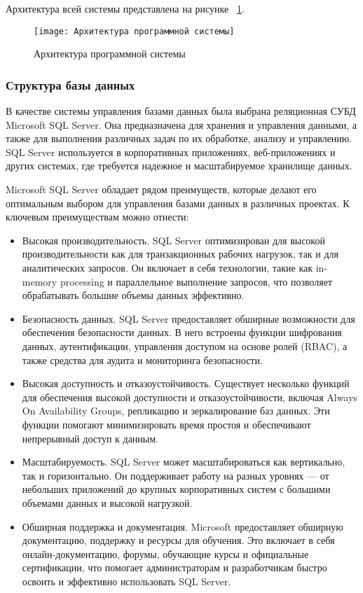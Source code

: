 Архитектура всей системы представлена на рисунке ~\ref{templ:image2}.
\begin{figure}[H]
	\texttt{[image: Архитектура программной системы]}
	\caption{Архитектура программной системы}
	\label{templ:image2}
\end{figure}

\subsubsection{Структура базы данных}

В качестве системы управления базами данных была выбрана реляционная СУБД Microsoft SQL Server. Она предназначена для хранения и управления данными, а также для выполнения различных задач по их обработке, анализу и управлению. SQL Server используется в корпоративных приложениях, веб-приложениях и других системах, где требуется надежное и масштабируемое хранилище данных.

Microsoft SQL Server обладает рядом преимуществ, которые делают его оптимальным выбором для управления базами данных в различных проектах. К ключевым преимуществам можно отнести:
\begin{itemize}
	\item Высокая производительность. SQL Server оптимизирован для высокой производительности как для транзакционных рабочих нагрузок, так и для аналитических запросов. Он включает в себя технологии, такие как in-memory processing и параллельное выполнение запросов, что позволяет обрабатывать большие объемы данных эффективно.
	\item Безопасность данных. SQL Server предоставляет обширные возможности для обеспечения безопасности данных. В него встроены функции шифрования данных, аутентификации, управления доступом на основе ролей (RBAC), а также средства для аудита и мониторинга безопасности.
	\item Высокая доступность и отказоустойчивость. Существует несколько функций для обеспечения высокой доступности и отказоустойчивости, включая Always On Availability Groups, репликацию и зеркалирование баз данных. Эти функции помогают минимизировать время простоя и обеспечивают непрерывный доступ к данным.
	\item Масштабируемость. SQL Server может масштабироваться как вертикально, так и горизонтально. Он поддерживает работу на разных уровнях — от небольших приложений до крупных корпоративных систем с большими объемами данных и высокой нагрузкой.
	\item Обширная поддержка и документация. Microsoft предоставляет обширную документацию, поддержку и ресурсы для обучения. Это включает в себя онлайн-документацию, форумы, обучающие курсы и официальные сертификации, что помогает администраторам и разработчикам быстро освоить и эффективно использовать SQL Server.
\end{itemize}

